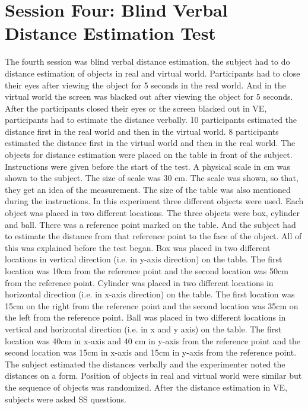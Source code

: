 \section{Session Four: Blind Verbal Distance Estimation Test}
The fourth session was blind verbal distance estimation, the subject had to do distance estimation of objects in real and virtual world. Participants had to close their eyes after viewing the object for 5 seconds in the real world. And in the virtual world the screen was blacked out after viewing the object for 5 seconds. After the participants closed their eyes or the screen blacked out in VE, participants had to estimate the distance verbally. 10 participants estimated the distance first in the real world and then in the virtual world. 8 participants estimated the distance first in the virtual world and then in the real world. The objects for distance estimation were placed on the table in front of the subject. Instructions were given before the start of the test. A physical scale in cm was shown to the subject. The size of scale was 30 cm. The scale was shown, so that, they get an idea of the measurement. The size of the table was also mentioned during the instructions. In this experiment three different objects were used. Each object was placed in two different locations. The three objects were
box, cylinder and ball. There was a reference point marked on the table. And the subject had to estimate the distance from that reference point to the face of the object. All of this was explained before the test began. Box was placed in two different locations in vertical direction (i.e. in y-axis direction) on the table. The first location was 10cm from the reference point and the second location was 50cm from the reference point. Cylinder was placed in two different locations in horizontal direction (i.e. in x-axis direction) on the table. The first location was 15cm on the right from the reference point and the second location was 35cm on the left from the reference point. Ball was placed in two different locations in vertical and horizontal
direction (i.e. in x and y axis) on the table. The first location was 40cm in x-axis and 40 cm in y-axis from the reference point and the second location was 15cm in x-axis and 15cm in y-axis from the reference point. The subject estimated the distances verbally and the experimenter noted the distances on a form. Position of objects in real and virtual world were similar but the sequence of objects was randomized. After the distance estimation in VE, subjects were asked SS questions. 


